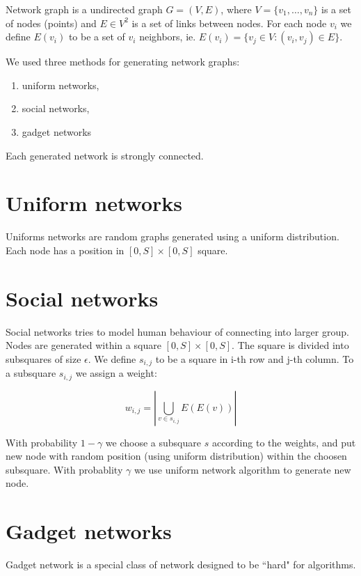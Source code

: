 \documentclass[a4paper,draft,12pt]{report}
\begin{document}
Network graph is a undirected graph $G = (V, E)$, where $V = \{v_1, \ldots, v_n\}$ is a set of nodes (points) and $E \in V^2$ is a set of links between nodes. For each node $v_i$ we define $E(v_i)$ to be a set of $v_i$ neighbors, ie. $E(v_i) = \{ v_j \in V : (v_i, v_j) \in E\}$.

We used three methods for generating network graphs:
\begin{enumerate}
\item uniform networks,
\item social networks,
\item gadget networks
\end{enumerate}

\noindent Each generated network is strongly connected.

\section{Uniform networks}

Uniforms networks are random graphs generated using a uniform distribution. Each node has a position in $[0, S] \times [0, S]$ square.

\section{Social networks}

Social networks tries to model human behaviour of connecting into larger group. Nodes are generated within a square $[0, S] \times [0, S]$. The square is divided into subsquares of size $\epsilon$. We define $s_{i,j}$ to be a square in i-th row and j-th column. To a subsquare $s_{i,j}$ we assign a weight:

\begin{equation*}
w_{i,j} = \left| \bigcup_{v \in s_{i,j}} E(E(v)) \right|
\end{equation*}

With probability $1 - \gamma$ we choose a subsquare $s$ according to the weights, and put new node with random position (using uniform distribution) within the choosen subsquare. With probablity $\gamma$ we use uniform network algorithm to generate new node.

\section{Gadget networks}

Gadget network is a special class of network designed to be  ``hard" for algorithms.
\end{document}
